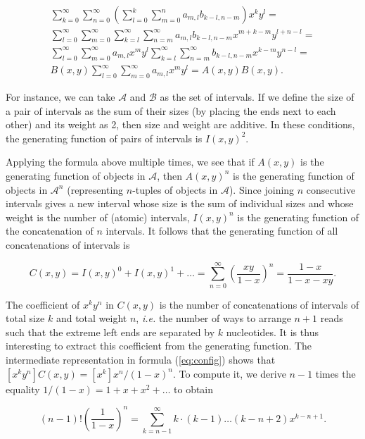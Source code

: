 \documentclass{article}
\begin{document}
\begin{gather*}
\sum_{k=0}^\infty \sum_{n=0}^\infty \left( \sum_{l=0}^k \sum_{m=0}^n
  a_{m,l}b_{k-l,n-m}\right) x^k y^l = \\ 
\sum_{l=0}^\infty \sum_{m=0}^\infty \sum_{k=l}^\infty \sum_{n=m}^\infty
  a_{m,l}b_{k-l,n-m}x^{m + k-m} y^{l + n-l} = \\
\sum_{l=0}^\infty \sum_{m=0}^\infty a_{m,l} x^m y^l
  \sum_{k=l}^\infty \sum_{n=m}^\infty
  b_{k-l,n-m}x^{k-m} y^{n-l} = \\
B(x,y) \sum_{l=0}^\infty \sum_{m=0}^\infty a_{m,l} x^m y^l
 = A(x,y)B(x,y).
\end{gather*}

For instance, we can take $\mathcal{A}$ and $\mathcal{B}$ as the set of
intervals. If we define the size of a pair of intervals as the sum of
their sizes (by placing the ends next to each other) and its weight as 2,
then size and weight are additive. In these conditions, the generating
function of pairs of intervals is $I(x,y)^2$.

Applying the formula above multiple times, we see that if $A(x,y)$ is the
generating function of objects in $\mathcal{A}$, then $A(x,y)^n$ is the
generating function of objects in $\mathcal{A}^n$ (representing $n$-tuples
of objects in $\mathcal{A}$). Since joining $n$ consecutive intervals
gives a new interval whose size is the sum of individual sizes and whose
weight is the number of (atomic) intervals, $I(x,y)^n$ is the generating
function of the concatenation of $n$ intervals. It follows that the
generating function of all concatenations of intervals is

\begin{equation}
\label{eq:config}
C(x,y) = I(x,y)^0 + I(x,y)^1 +\ldots
= \sum_{n=0}^\infty \left( \frac{xy}{1-x} \right)^n
= \frac{1-x}{1 - x - xy}.
\end{equation}


The coefficient of $x^ky^n$ in $C(x,y)$ is the number of concatenations of
intervals of total size $k$ and total weight $n$, \textit{i.e.} the number
of ways to arrange $n+1$ reads such that the extreme left ends are
separated by $k$ nucleotides. It is thus interesting to extract this
coefficient from the generating function. The intermediate representation
in formula (\ref{eq:config}) shows that $[x^ky^n]C(x,y) = [x^k]
x^n/(1-x)^n$. To compute it, we derive $n-1$ times the equality $1/(1-x) =
1 + x + x^2 + \ldots$ to obtain

\begin{equation*}
(n-1)! \left( \frac{1}{1-x} \right)^n =
\sum_{k=n-1}^\infty k \cdot (k-1) \ldots (k-n+2) x^{k-n+1}.
\end{equation*}
\end{document}
